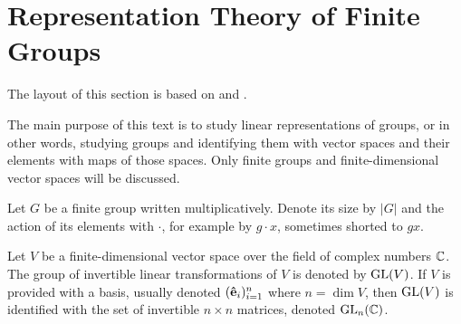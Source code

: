 \clearpage{\thispagestyle{empty}}
\section{Representation Theory of Finite Groups}

The layout of this section is based on \cite{FultonHarris} and \cite{Serre}.

The main purpose of this text is to study linear representations of groups, or in other words, studying groups and identifying them with vector spaces and their elements with maps of those spaces. Only finite groups and finite-dimensional vector spaces will be discussed.

Let $G$ be a finite group written multiplicatively. Denote its size by $|G|$ and the action of its elements with $\cdot$, for example by $g \cdot x$, sometimes shorted to $gx$.

Let $V$ be a finite-dimensional vector space over the field of complex numbers $\mathbb{C}$. The group of invertible linear transformations of $V$ is denoted by $\text{GL}(V)$. If $V$ is provided with a basis, usually denoted $(\mathbf{\hat{e}}_i)_{i=1}^n$ where $n = \dim V$, then $\text{GL}(V)$ is identified with the set of invertible $n \times n$ matrices, denoted $\text{GL}_n(\mathbb{C})$\cite[18.1]{DummitFoote}.

